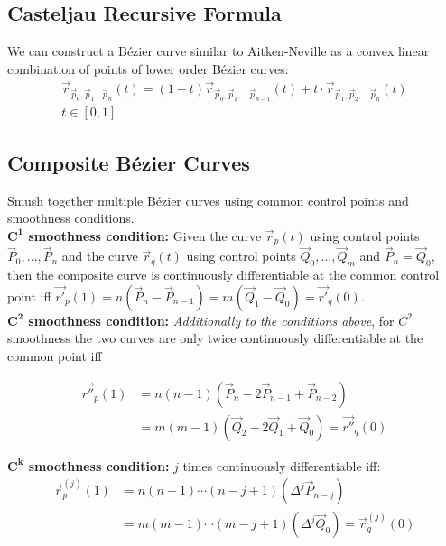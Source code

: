 \subsection{Casteljau Recursive Formula}
We can construct a B\'ezier curve similar to Aitken-Neville as a convex linear combination of points of lower order B\'ezier curves:
\begin{align*}
	\vec{r}_{\vec{p}_{0},\vec{p}_{1}\ldots\vec{p}_{n}}(t)
	= (1-t)\vec{r}_{\vec{p}_{0},\vec{p}_{1},\ldots\vec{p}_{n-1}}(t)+t\cdot\vec{r}_{\vec{p}_{1},\vec{p}_{2},\ldots\vec{p}_{n}}(t) \\
	t\in[0,1]
\end{align*}



\subsection{Composite B\'ezier Curves}
Smush together multiple B\'ezier curves using common control points and smoothness conditions.
\\[1em]
\textbf{$\mathbf{C^1}$ smoothness condition:}
Given the curve $\vec{r}_p(t)$ using control points $\vec{P}_0,\ldots,\vec{P}_n$
and the curve $\vec{r}_q(t)$ using control points $\vec{Q}_0,\ldots,\vec{Q}_m$
and $\vec{P}_n=\vec{Q}_0$, then the composite curve is continuously differentiable at the common control point iff
\colorbox{shadecolor}{$\vec{r'}_p(1) = n(\vec{P}_n - \vec{P}_{n-1}) = m(\vec{Q}_1 - \vec{Q}_0) = \vec{r'}_q(0)$}.
\\[1em]
\textbf{$\mathbf{C^2}$ smoothness condition:}
\emph{Additionally to the conditions above},
for $C^2$ smoothness the two curves are only twice continuously differentiable at the common point iff
\begin{snugshade*}
	\begin{align*}
		\vec{r''}_p(1) & = n(n-1)\left(\vec{P}_n-2\vec{P}_{n-1}+\vec{P}_{n-2}\right) \\
		& = m(m-1)\left(\vec{Q}_2 - 2\vec{Q}_1 + \vec{Q}_0\right) = \vec{r''}_q(0)
	\end{align*}
\end{snugshade*}
\textbf{$\mathbf{C^k}$ smoothness condition:}
$j$ times continuously differentiable iff:
\begin{align*}
	\vec{r}^{(j)}_p(1) & = n(n-1)\cdots(n-j+1)(\Delta^{j}\vec{P}_{n-j}) \\
	& = m(m-1)\cdots(m-j+1)(\Delta^{j}\vec{Q}_{0}) = \vec{r}^{(j)}_q(0)
\end{align*}
